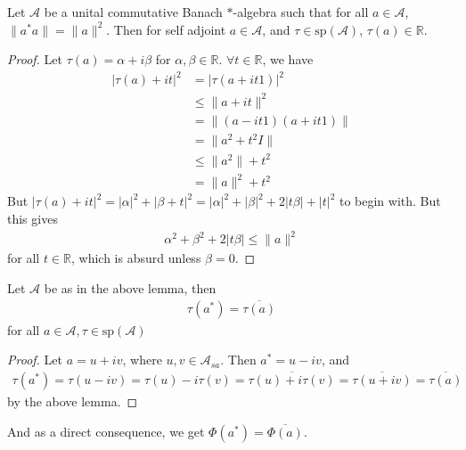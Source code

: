 

\begin{lemma}
  \label{lem:3}
  Let $\mathcal{A}$ be a unital commutative Banach $*$-algebra such
  that for all $a \in \mathcal{A}$, $\|a^*a\| = \|a\|^2$. Then for
  self adjoint $a \in \mathcal{A}$, and  $\tau \in
  \textrm{sp}(\mathcal{A})$, $\tau(a) \in \mathbb{R}$.
\end{lemma}
\begin{proof}
  Let $\tau(a) = \alpha + i \beta$ for $\alpha, \beta \in
  \mathbb{R}$. $\forall t \in \mathbb{R}$, we have
  \begin{align*}
    |\tau(a) + it|^2 &= |\tau(a + it 1)|^2 \\
    &\le \| a + i t\|^2 \\
    &= \|(a - i t 1)(a + it 1)\| \\
    &= \| a^2 + t^2 I \| \\
    &\le \|a^2\| + t^2 \\
    &= \|a\|^2 + t^2
  \end{align*}
  But $|\tau(a) + it|^2 = |\alpha|^2 + |\beta + t|^2 = |\alpha|^2 +
  |\beta|^2 + 2|t \beta| + |t|^2$ to begin with. But this gives
  \begin{align*}
    \alpha^2 + \beta^2 + 2|t \beta| \le \|a\|^2
  \end{align*}
  for all $t \in \mathbb{R}$, which is absurd unless $\beta = 0$.
\end{proof}

\begin{lemma}
  \label{lem:3.1}
  Let $\mathcal{A}$ be as in the above lemma, then
  \begin{align*}
    \tau(a^*) = \overline{\tau(a)}
  \end{align*}
  for all $a \in \mathcal{A}, \tau \in \textrm{sp}(\mathcal{A})$
\end{lemma}
\begin{proof}
  Let $a = u + iv$, where $u, v \in \mathcal{A}_{sa}$. Then $a^* = u - iv$, and
  \begin{align*}
    \tau(a^*) = \tau(u - iv) = \tau(u) - i \tau(v) =
    \overline{\tau(u) + i \tau(v)} = \overline{\tau(u + iv)} =
    \overline{\tau(a)}
  \end{align*}
  by the above lemma.
\end{proof}
And as a direct consequence, we get $\Phi(a^*) = \overline{\Phi(a)}$.

